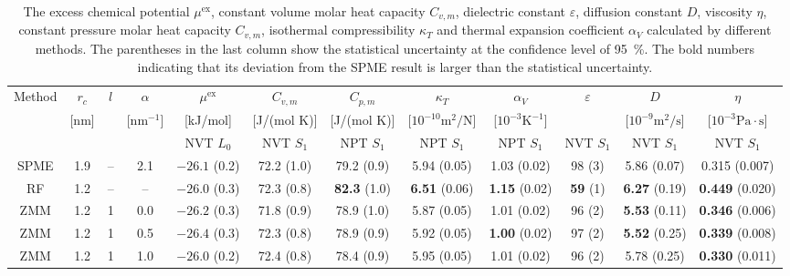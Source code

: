 \documentclass[a4paper,preprint,unsortedaddress,onecolumn,fleqn]{revtex4}
\newcommand{\eps}{\varepsilon}
\newcommand{\exc}{\textrm{ex}}
\newcommand{\systemsb}{S_1}
\newcommand{\systemla}{L_0}
\begin{document}
\begin{sidewaystable}
  \centering
  \caption{The excess chemical potential $\mu^\exc$, constant volume molar heat capacity $C_{v,m}$, dielectric constant $\eps$, diffusion constant $D$, viscosity $\eta$, constant pressure molar heat capacity $C_{v,m}$, isothermal compressibility $\kappa_T$ and
    thermal expansion coefficient $\alpha_V$
    calculated by different methods.    
    The parentheses in the last column show the statistical uncertainty
    at the confidence level of 95~\%.
    The bold numbers indicating that its deviation from the SPME result is larger than the statistical uncertainty.
  }
  \bigskip
  \centering\small\setlength\tabcolsep{2pt}
  \begin{tabular*}{0.99\textwidth}{@{\extracolsep{\fill}}cccc cccccccc}\hline\hline
    Method      &   $r_c$ &    $l$ & $\alpha$  & $\mu^\exc$  &$C_{v,m}$ & $C_{p,m}$ &   $\kappa_T$  &$\alpha_V$ &  $\eps$ & $D$ &  $\eta$  \\
                & [nm] & & [$\textrm{nm}^{-1}$] &   [kJ/mol] &[J/(mol K)] & [J/(mol K)] & [$10^{-10}\textrm{m}^2/\textrm{N}$] &  [$10^{-3}\textrm{K}^{-1}$]&  & [$10^{-9}\textrm{m}^2/\textrm{s}$] &  [$10^{-3}\textrm{Pa}\cdot\textrm{s}$]  \\
                &    &    &    &NVT $\systemla$&NVT $\systemsb$&  NPT $\systemsb$          &  NPT $\systemsb$    &  NPT $\systemsb$    & NVT $\systemsb$& NVT $\systemsb$    & NVT $\systemsb$       \\\hline
    SPME        &1.9 & -- &2.1 & $-26.1$ (0.2) & 72.2 (1.0)  &79.2 (0.9)           & 5.94 (0.05)               &1.03 (0.02)          & 98 (3)          &         5.86  (0.07)&         0.315  (0.007)\\
    RF          &1.2 & -- &--  & $-26.0$ (0.3) & 72.3 (0.8)  &\textbf{82.3} (1.0)  & \textbf{6.51} (0.06)      &\textbf{1.15} (0.02) & \textbf{59} (1) & \textbf{6.27} (0.19)& \textbf{0.449} (0.020)\\\hline
    ZMM          &1.2 & 1  &0.0 & $-26.2$ (0.3) & 71.8 (0.9)  &78.9 (1.0)           & 5.87 (0.05)               &1.01 (0.02)          & 96 (2)          & \textbf{5.53} (0.11)& \textbf{0.346} (0.006)\\ 
    ZMM          &1.2 & 1  &0.5 & $-26.4$ (0.3) & 72.3 (0.8)  &78.9 (0.9)           & 5.92 (0.05)               &\textbf{1.00} (0.02) & 97 (2)          & \textbf{5.52} (0.25)& \textbf{0.339} (0.008)\\ 
    ZMM          &1.2 & 1  &1.0 & $-26.0$ (0.2) & 72.4 (0.8)  &78.4 (0.9)           & 5.95 (0.05)               &1.01 (0.02)          & 96 (2)          &        {5.78} (0.25)& \textbf{0.330} (0.011)\\ 

\end{tabular*}
\end{sidewaystable}
\end{document}
